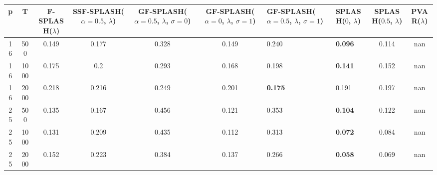 \begin{tabular}{ccccccllcc}
\hline
  p  &  T   &  F-SPLASH($\lambda$)  &  SSF-SPLASH($\alpha=0.5$, $\lambda$)  &  GF-SPLASH($\alpha=0.5$, $\lambda$, $\sigma=0$)  &  GF-SPLASH($\alpha=0$, $\lambda$, $\sigma=1$)  & GF-SPLASH($\alpha=0.5$, $\lambda$, $\sigma=1$)   & SPLASH($0$, $\lambda$)   &  SPLASH($0.5$, $\lambda$)  &  PVAR($\lambda$)  \\
\hline
 16  & 500  &         0.149         &                 0.177                 &                      0.328                       &                     0.149                      & 0.240                                            & \textbf{0.096}           &           0.114            &        nan        \\
 16  & 1000 &         0.175         &                  0.2                  &                      0.293                       &                     0.168                      & 0.198                                            & \textbf{0.141}           &           0.152            &        nan        \\
 16  & 2000 &         0.218         &                 0.216                 &                      0.249                       &                     0.201                      & \textbf{0.175}                                   & 0.191                    &           0.197            &        nan        \\
 25  & 500  &         0.135         &                 0.167                 &                      0.456                       &                     0.121                      & 0.353                                            & \textbf{0.104}           &           0.122            &        nan        \\
 25  & 1000 &         0.131         &                 0.209                 &                      0.435                       &                     0.112                      & 0.313                                            & \textbf{0.072}           &           0.084            &        nan        \\
 25  & 2000 &         0.152         &                 0.223                 &                      0.384                       &                     0.137                      & 0.266                                            & \textbf{0.058}           &           0.069            &        nan        \\
\hline
\end{tabular}